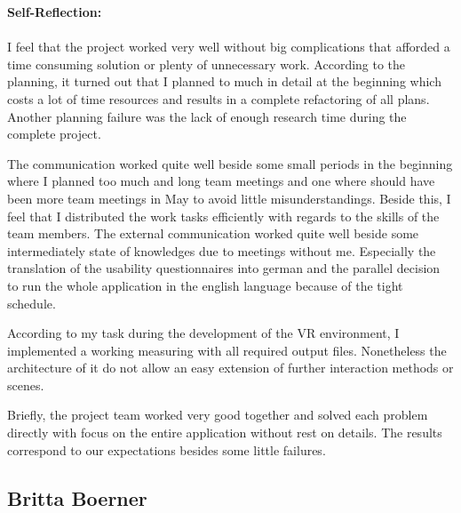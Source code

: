 \textbf{Self-Reflection:}\\ \\
I feel that the project worked very well without big complications that afforded a time consuming solution or plenty of unnecessary work. According to the planning, it turned out that I planned to much in detail at the beginning which costs a lot of time resources and results in a complete refactoring of all plans. Another planning failure was the lack of enough research time during the complete project. 

The communication worked quite well beside some small periods in the beginning where I planned too much and long team meetings and one where should have been more team meetings in May to avoid little misunderstandings. Beside this, I feel that I distributed the work tasks efficiently with regards to the skills of the team members. The external communication worked quite well beside some intermediately state of knowledges due to meetings without me. Especially the translation of the usability questionnaires into german and the parallel decision to run the whole application in the english language because of the tight schedule. 

According to my task during the development of the VR environment, I implemented a working measuring with all required output files. Nonetheless the architecture of it do not allow an easy extension of further interaction methods or scenes. 

Briefly, the project team worked very good together and solved each problem directly with focus on the entire application without rest on details. The results correspond to our expectations besides some little failures.
\subsection{Britta Boerner} \label{sec:SABritta}


